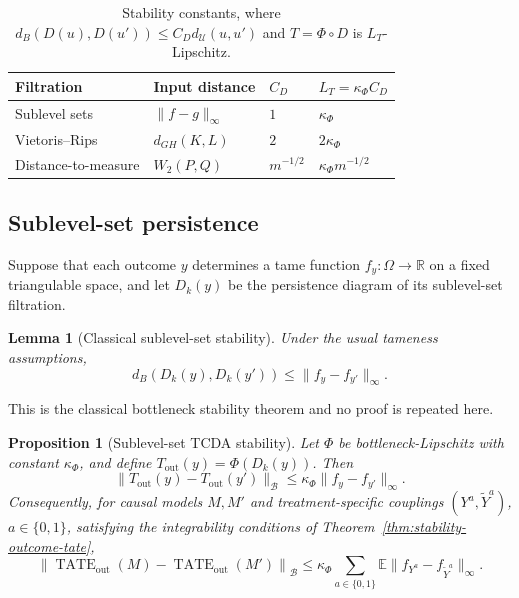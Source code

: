 \documentclass[11pt,a4paper]{article}
\theoremstyle{plain}
\newtheorem{proposition}[theorem]{Proposition}
\newtheorem{lemma}[theorem]{Lemma}
\theoremstyle{definition}
\theoremstyle{remark}
\newcommand{\1}{\mathbbm{1}}
\begin{document}
\begin{table}[ht]
\centering
\begin{tabular}{@{}llll@{}}
\hline
Filtration
& Input distance
& \(C_D\)
& \(L_T=\kappa_\Phi C_D\) \\
\hline
Sublevel sets
& \(\|f-g\|_\infty\)
& \(1\)
& \(\kappa_\Phi\) \\

Vietoris--Rips
& \(d_{GH}(K,L)\)
& \(2\)
& \(2\kappa_\Phi\) \\

Distance-to-measure
& \(W_2(P,Q)\)
& \(m^{-1/2}\)
& \(\kappa_\Phi m^{-1/2}\) \\
\hline
\end{tabular}
\caption{Stability constants, where
\(d_B(D(u),D(u'))\leq C_Dd_{\mathcal U}(u,u')\) and
\(T=\Phi\circ D\) is \(L_T\)-Lipschitz.}
\label{tab:stability-transfer}
\end{table}

\subsection{Sublevel-set persistence}
\label{subsec:sublevel-stability}

Suppose that each outcome \(y\) determines a tame function
\(f_y:\Omega\to\mathbb R\) on a fixed triangulable space, and let \(D_k(y)\) be the persistence diagram of its sublevel-set filtration.

\begin{lemma}[Classical sublevel-set stability]
\label{lem:sublevel-diagram-stability}
Under the usual tameness assumptions,
\[
d_B(D_k(y),D_k(y'))
\leq
\|f_y-f_{y'}\|_\infty.
\]
\end{lemma}

This is the classical bottleneck stability theorem
\citep{cohensteineredelsbrunnerharer2007} and no proof is repeated here.

\begin{proposition}[Sublevel-set TCDA stability]
\label{prop:sublevel-causal-stability}
Let \(\Phi\) be bottleneck-Lipschitz with constant \(\kappa_\Phi\), and define \(T_{\mathrm{out}}(y)=\Phi(D_k(y))\). Then
\[
\|T_{\mathrm{out}}(y)-T_{\mathrm{out}}(y')\|_{\mathcal B}
\leq
\kappa_\Phi\|f_y-f_{y'}\|_\infty.
\]
Consequently, for causal models \(M,M'\) and
treatment-specific couplings
\((Y^a,\widetilde Y^a)\), \(a\in\{0,1\}\), satisfying the
integrability conditions of
Theorem~\ref{thm:stability-outcome-tate},
\[
\left\|
\operatorname{TATE}_{\mathrm{out}}(M)
-
\operatorname{TATE}_{\mathrm{out}}(M')
\right\|_{\mathcal B}
\leq
\kappa_\Phi
\sum_{a\in\{0,1\}}
\mathbb E\|f_{Y^a}-f_{\widetilde Y^a}\|_\infty.
\]
\end{proposition}
\end{document}
